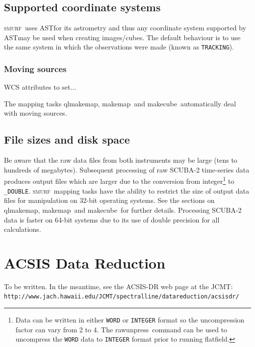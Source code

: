 \documentclass[twoside,11pt]{article}
\newcommand{\htmladdnormallink}[2]{#1}
\newcommand{\xref}[3]{#1}
\newcommand{\xlabel}[1]{}
\renewcommand{\_}{\texttt{\symbol{95}}}
\newcommand{\SMURF}{\textsc{smurf}}
\newcommand{\AST}{\xref{AST}{sun210}}
\newcommand{\task}[1]{\textsf{#1}}
\newcommand{\makecube}{\xref{\task{makecube}}{sun258}{MAKECUBE}}
\newcommand{\qlmakemap}{\xref{\task{qlmakemap}}{sun258}{QLMAKEMAP}}
\newcommand{\rawunpress}{\xref{\task{rawunpress}}{sun258}{RAWUNPRESS}}
\newcommand{\flatfield}{\xref{\task{flatfield}}{sun258}{FLATFIELD}}
\newcommand{\makemap}{\xref{\task{makemap}}{sun258}{MAKEMAP}}
\newcommand{\aparam}[1]{\texttt{#1}}     %
\begin{document}
\subsection{Supported coordinate systems}

\SMURF\ uses \AST\ for its astrometry and thus any coordinate system
supported by \AST\ may be used when creating images/cubes. The default
behaviour is to use the same system in which the observations were
made (known as \aparam{TRACKING}).

\subsubsection{Moving sources}

WCS attributes to set...

The mapping tasks \qlmakemap, \makemap\ and \makecube\ automatically
deal with moving sources.

\subsection{File sizes and disk space}

Be aware that the raw data files from both instruments may be large
(tens to hundreds of megabytes). Subsequent processing of raw SCUBA-2
time-series data produces output files which are larger due to the
conversion from integer\footnote{Data can be written in either
  \texttt{\_WORD} or \texttt{\_INTEGER} format so the uncompression
  factor can vary from 2 to 4. The \rawunpress\ command can be used to
  uncompress the \texttt{\_WORD} data to \texttt{\_INTEGER} format
  prior to running \flatfield.}  to \verb+_DOUBLE+. \SMURF\ mapping
tasks have the ability to restrict the size of output data files for
manipulation on 32-bit operating systems. See the sections on
\qlmakemap, \makemap\ and \makecube\ for further details. Processing
SCUBA-2 data is faster on 64-bit systems due to its use of double
precision for all calculations.

\section{\xlabel{acsis}ACSIS Data Reduction\label{se:acsisdr}}

To be written. In the meantime, see the ACSIS-DR web page at the JCMT:\\
\htmladdnormallink{\texttt{http://www.jach.hawaii.edu/JCMT/spectral\_line/data\_reduction/acsisdr/}}
{http://www.jach.hawaii.edu/JCMT/spectral_line/data_reduction/acsisdr/}
\end{document}
